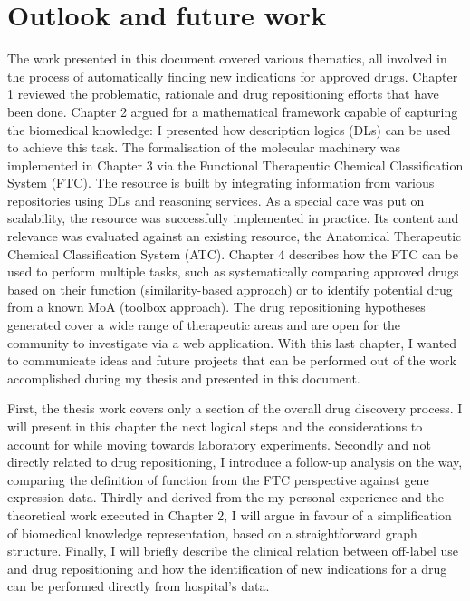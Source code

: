 \chapter{Outlook and future work}
The work presented in this document covered various thematics, all involved in the process of automatically finding new indications for approved drugs. Chapter 1 reviewed the problematic, rationale and drug repositioning efforts that have been done. Chapter 2 argued for a mathematical framework capable of capturing the biomedical knowledge: I presented how description logics (DLs) can be used to achieve this task. The formalisation of the molecular machinery was implemented in Chapter 3 via the Functional Therapeutic Chemical Classification System (FTC). The resource is built by integrating information from various repositories using DLs and reasoning services. As a special care was put on scalability, the resource was successfully implemented in practice. Its content and relevance was evaluated against an existing resource, the Anatomical Therapeutic Chemical Classification System (ATC). Chapter 4 describes how the FTC can be used to perform multiple tasks, such as systematically comparing approved drugs based on their function (similarity-based approach) or to identify potential drug from a known MoA (toolbox approach). The drug repositioning hypotheses generated cover a wide range of therapeutic areas and are open for the community to investigate via a web application. With this last chapter, I wanted to communicate ideas and future projects that can be performed out of the work accomplished during my thesis and presented in this document.

First, the thesis work covers only a section of the overall drug discovery process. I will present in this chapter the next logical steps and the considerations to account for while moving towards laboratory experiments. Secondly and not directly related to drug repositioning, I introduce a follow-up analysis on the way, comparing the definition of function from the FTC perspective against gene expression data. Thirdly and derived from the my personal experience and the theoretical work executed in Chapter 2, I will argue in favour of a simplification of biomedical knowledge representation, based on a straightforward graph structure. Finally, I will briefly describe the clinical relation between off-label use and drug repositioning and how the identification of new indications for a drug can be performed directly from hospital’s data.

